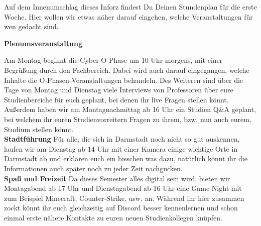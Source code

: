 {Auf dem Innenumschlag dieses Inforz findest Du Deinen Stundenplan für die erste Woche. Hier wollen wir etwas näher darauf eingehen, welche Veranstaltungen für wen gedacht sind.}
{\textbf{Plenumsveranstaltung}

Am Montag beginnt die Cyber-O-Phase um 10 Uhr morgens, mit einer Begrüßung durch den Fachbereich. Dabei wird auch darauf eingegangen, welche Inhalte die O-Phasen-Veranstaltungen behandeln. Des Weiteren sind über die Tage von Montag und Dienstag viele Interviews von Professoren über eure Studienbereiche für euch geplant, bei denen ihr live Fragen stellen könnt.  Außerdem haben wir am Montagnachmittag ab 16 Uhr ein Studien Q\&A geplant, bei welchem ihr euren Studienvorreitern Fragen zu ihrem, bzw. nun auch eurem, Studium stellen könnt. \\

\textbf{Stadtführung}
Für alle, die sich in Darmstadt noch nicht so gut auskennen, laufen wir am Dienstag ab 14 Uhr mit einer Kamera einige wichtige Orte in Darmstadt ab und erklären euch ein bisschen was dazu, natürlich könnt ihr die Informationen auch später noch zu jeder Zeit nachgucken.\\

\textbf{Spaß und Freizeit}
Da dieses Semester alles digital sein wird, bieten wir Montagabend ab 17 Uhr und Dienstagabend ab 16 Uhr eine Game-Night mit zum Beispiel Minecraft, Counter-Strike, usw. an. Während ihr hier zusammen zockt könnt ihr euch gleichzeitig auf Discord besser kennenlernen und schon einmal erste nähere Kontakte zu euren neuen Studienkollegen knüpfen. 
}{}
